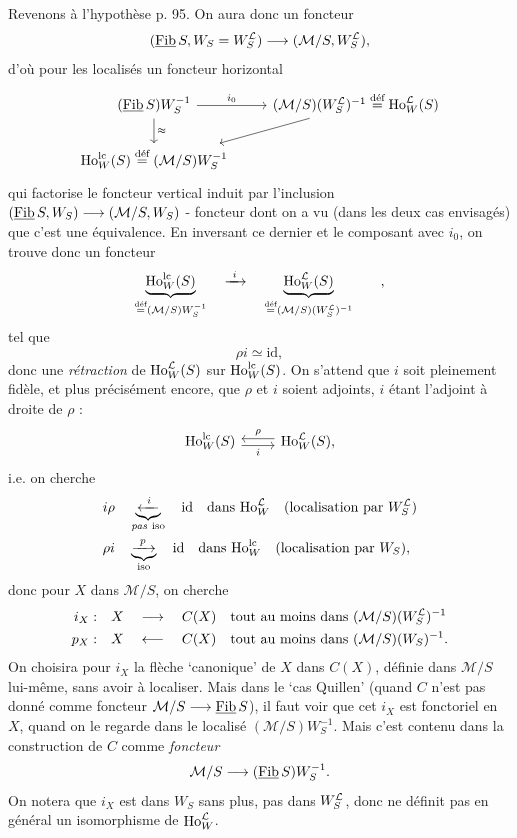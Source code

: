 Revenons à l'hypothèse p. 95. On aura donc un foncteur
\[
(\Fibu S, W_S = \WL) \longrightarrow (\mathcal{M}/S, \WL),
\]
d'où pour les localisés un foncteur horizontal
\[
\begin{tikzcd}
(\Fibu S)W_S^{-1} \arrow[r, "i_0"] \arrow[d, "\approx"] & (\mathcal{M}/S)(\WL)^{-1} \defeq \Ho_W^{\mathcal{L}}(S) \arrow[dl] \\
\Ho_W^{\mathrm{lc}}(S) \defeq (\mathcal{M}/S)W_S^{-1} &
\end{tikzcd}
\]
qui factorise le foncteur vertical induit par l'inclusion $(\Fibu S, W_S) \longrightarrow (\mathcal{M}/S, W_S)$ - foncteur dont on a vu (dans les deux cas envisagés) que c'est une équivalence. En inversant ce dernier et le composant avec $i_0$, on trouve donc un foncteur
\[
\underbrace{\Ho_W^{\mathrm{lc}}(S)}_{\defeq (\mathcal{M}/S)W_S^{-1}} \quad \xrightarrow{\ i\ } \quad \underbrace{\Ho_W^{\mathcal{L}}(S)}_{\defeq (\mathcal{M}/S)(\WL)^{-1}} \qquad ,
\]
tel que
\[
\rho i \simeq \mathrm{id},
\]
donc une \textit{rétraction} de $\Ho_W^{\mathcal{L}}(S)$ sur $\Ho_W^{\mathrm{lc}}(S)$. On s'attend que $i$ soit pleinement fidèle, et plus précisément encore,  que $\rho$ et $i$ soient adjoints, $i$ étant l'adjoint à droite de $\rho$ :
\[
\begin{tikzcd}
\Ho_W^{\mathrm{lc}}(S) \arrow[r, shift right, "i"'] & \Ho_W^{\mathcal{L}}(S), \arrow[l, shift right, "\rho"']
\end{tikzcd}
\]
i.e. on cherche
\[
\begin{aligned}
i\rho &\quad \underbrace{\xleftarrow{\ i\ }}_{\textit{pas}\ \text{iso}} \quad \mathrm{id} \quad \text{dans } \Ho_W^{\mathcal{L}} \quad (\text{localisation par } \WL)\\
\rho i &\quad \underbrace{\xrightarrow{\ p\ }}_{\text{iso}} \quad \mathrm{id} \quad \text{dans } \Ho_W^{\mathrm{lc}} \quad (\text{localisation par } W_S),
\end{aligned}
\]
 donc pour $X$ dans $\mathcal{M}/S$, on cherche
\[
\begin{aligned}
i_X :&\quad X \quad \longrightarrow \quad C(X) \quad \text{tout au moins dans } (\mathcal{M}/S)(\WL)^{-1}\\
p_X :&\quad X \quad \longleftarrow \quad C(X) \quad \text{tout au moins dans } (\mathcal{M}/S)(W_S)^{-1}.
\end{aligned}
\]
On choisira pour $i_X$ la flèche `canonique' de $X$ dans $C(X)$, définie dans $\mathcal{M}/S$ lui-même, sans avoir à localiser. Mais dans le `cas Quillen' (quand $C$ n'est pas donné comme foncteur $\mathcal{M}/S \longrightarrow \Fibu S$), il faut voir que cet $i_X$ est fonctoriel en $X$, quand on le regarde dans le localisé $(\mathcal{M}/S)W_S^{-1}$. Mais c'est contenu dans la construction de $C$ comme \textit{foncteur}
\[
\mathcal{M}/S \longrightarrow (\Fibu S)W_S^{-1}.
\]
On notera que $i_X$ est dans $W_S$ sans plus, pas dans $\WL$, donc ne définit pas en général un isomorphisme de $\Ho_W^{\mathcal{L}}$.

